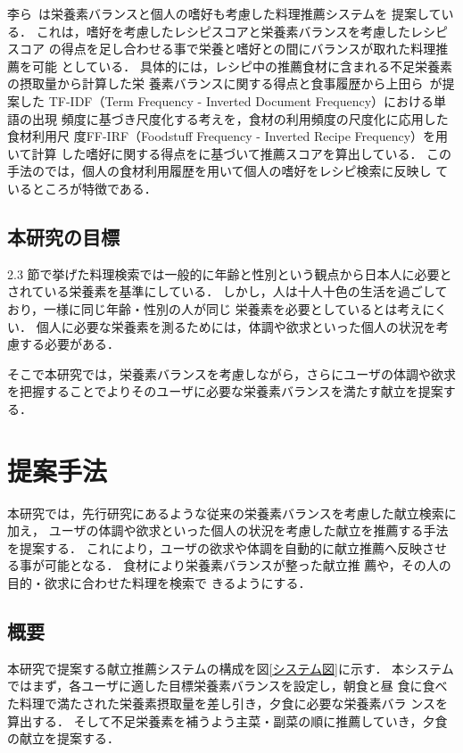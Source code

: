 \documentclass[11pt,titlepage,uplatex]{ujreport}
\begin{document}
李ら~\cite{li09}は栄養素バランスと個人の嗜好も考慮した料理推薦システムを
提案している．
これは，嗜好を考慮したレシピスコアと栄養素バランスを考慮したレシピスコア
の得点を足し合わせる事で栄養と嗜好との間にバランスが取れた料理推薦を可能
としている．
具体的には，レシピ中の推薦食材に含まれる不足栄養素の摂取量から計算した栄
養素バランスに関する得点と食事履歴から上田ら~\cite{ueda08}が提案した
TF-IDF（Term Frequency - Inverted Document Frequency）における単語の出現
頻度に基づき尺度化する考えを，食材の利用頻度の尺度化に応用した食材利用尺
度FF-IRF（Foodstuff Frequency - Inverted Recipe Frequency）を用いて計算
した嗜好に関する得点をに基づいて推薦スコアを算出している．
この手法のでは，個人の食材利用履歴を用いて個人の嗜好をレシピ検索に反映し
ているところが特徴である．


\section{本研究の目標}
2.3 節で挙げた料理検索では一般的に年齢と性別という観点から日本人に必要と
されている栄養素を基準にしている．
しかし，人は十人十色の生活を過ごしており，一様に同じ年齢・性別の人が同じ
栄養素を必要としているとは考えにくい．
個人に必要な栄養素を測るためには，体調や欲求といった個人の状況を考慮する必要がある．

そこで本研究では，栄養素バランスを考慮しながら，さらにユーザの体調や欲求
を把握することでよりそのユーザに必要な栄養素バランスを満たす献立を提案す
る．

\chapter{提案手法}
本研究では，先行研究にあるような従来の栄養素バランスを考慮した献立検索に加え，
ユーザの体調や欲求といった個人の状況を考慮した献立を推薦する手法を提案する．
これにより，ユーザの欲求や体調を自動的に献立推薦へ反映させる事が可能となる．
食材により栄養素バランスが整った献立推
薦や，その人の目的・欲求に合わせた料理を検索で
きるようにする．
\section{概要}
本研究で提案する献立推薦システムの構成を図\ref{システム図}に示す．
本システムではまず，各ユーザに適した目標栄養素バランスを設定し，朝食と昼
食に食べた料理で満たされた栄養素摂取量を差し引き，夕食に必要な栄養素バラ
ンスを算出する．
そして不足栄養素を補うよう主菜・副菜の順に推薦していき，夕食の献立を提案する．
\end{document}
